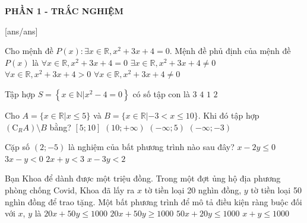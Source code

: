 

\begin{center}
	\textbf{PHẦN 1 - TRẮC NGHIỆM}
\end{center}
[ans/ans]
\begin{ex}%
	Cho mệnh đề $P(x)\colon \exists x \in \mathbb{R}, x^2+3 x+4=0$. Mệnh đề phủ định của mệnh đề $P(x)$ là
	\choice
	{$\forall x \in \mathbb{R}, x^2+3 x+4=0$}
	{$\exists x \in \mathbb{R}, x^2+3 x+4 \neq 0$}
	{$\forall x \in \mathbb{R}, x^2+3 x+4>0$}
	{\True $\forall x \in \mathbb{R}, x^2+3 x+4 \neq 0$}
\end{ex}
\begin{ex}%
	Tập hợp $S=\left\{x \in\mathbb{N}| x^2-4=0\right\}$ có số tập con là
	\choice
	{$3$}
	{$4$}
	{$1$}
	{\True $2$}
\end{ex}
\begin{ex}%
	Cho $A=\{x \in \mathbb{R}| x \leq 5\}$ và $B=\{x \in \mathbb{R}|-3<x \leq 10\}$. Khi đó tập hợp $\left(\mathrm{C}_R A\right)\setminus B$ bằng?
	\choice
	{$[5 ; 10]$}
	{\True $(10 ;+\infty)$}
	{$(-\infty ; 5)$}
	{$(-\infty ;-3)$}
\end{ex}
\begin{ex}%
	Cặp số $(2;-5)$ là nghiệm của bất phương trình nào sau đây?
	\choice
	{$x-2y \le 0$}
	{$3x-y<0$}
	{$2x+y<3$}
	{$x-3y<2$}
\end{ex}
\begin{ex}%
	Bạn Khoa để dành được một triệu đồng. Trong một đợt ủng hộ địa phương phòng chống Covid, Khoa đã lấy ra $x$ tờ tiền loại 20 nghìn đồng, $y$ tờ tiền loại 50 nghìn đồng để trao tặng. Một bất phương trình để mô tả điều kiện ràng buộc đối với $x$, $y$ là
	\choice
	{\True $20x+50y \le 1000$}
	{$20x+50y \ge 1000$}
	{$50x+20y \le 1000$}
	{$x+y \leq 1000$}
\end{ex}
